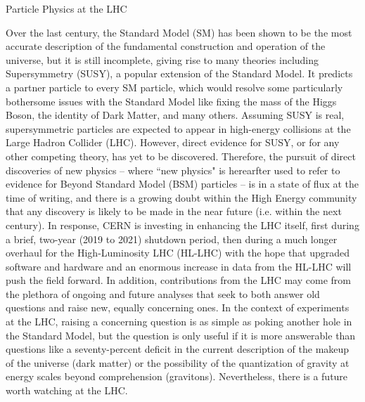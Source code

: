 %
%

\begin{section}{Particle Physics at the LHC}

Over the last century, the Standard Model (SM) has been shown to be the most accurate description of the fundamental construction and operation of the universe, but it is still incomplete, giving rise to many theories including Supersymmetry (SUSY), a popular extension of the Standard Model. It predicts a partner particle to every SM particle, which would resolve some particularly bothersome issues with the Standard Model like fixing the mass of the Higgs Boson, the identity of Dark Matter, and many others. Assuming SUSY is real, supersymmetric particles are expected to appear in high-energy collisions at the Large Hadron Collider (LHC). However, direct evidence for SUSY, or for any other competing theory, has yet to be discovered. Therefore, the pursuit of direct discoveries of new physics -- where ``new physics" is herearfter used to refer to evidence for Beyond Standard Model (BSM) particles -- is in a state of flux at the time of writing, and there is a growing doubt within the High Energy community that any discovery is likely to be made in the near future (i.e. within the next century). In response, CERN is investing in enhancing the LHC itself, first during a brief, two-year (2019 to 2021) shutdown period, then during a much longer overhaul for the High-Luminosity LHC (HL-LHC) with the hope that upgraded software and hardware and an enormous increase in data from the HL-LHC will push the field forward. In addition, contributions from the LHC may come from the plethora of ongoing and future analyses that seek to both answer old questions and raise new, equally concerning ones. In the context of experiments at the LHC, raising a concerning question is as simple as poking another hole in the Standard Model, but the question is only useful if it is more answerable than questions like a seventy-percent deficit in the current description of the makeup of the universe (dark matter) or the possibility of the quantization of gravity at energy scales beyond comprehension (gravitons). Nevertheless, there is a future worth watching at the LHC.

\end{section}

